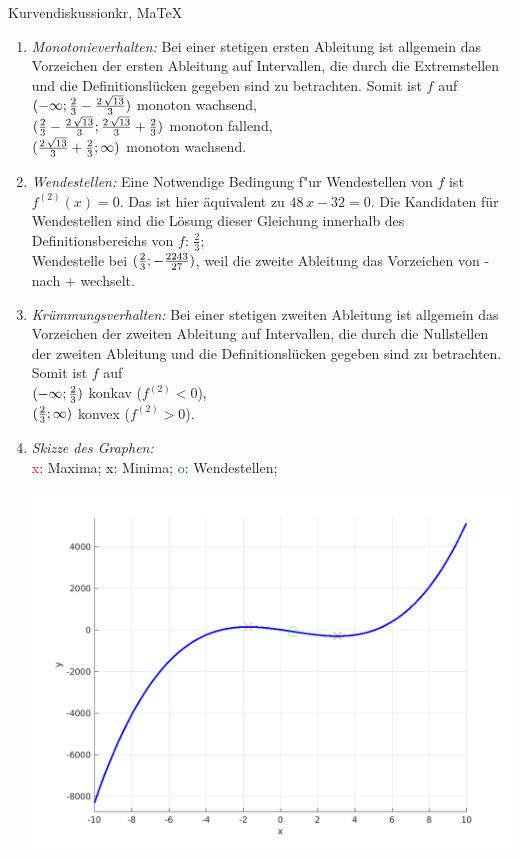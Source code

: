 \begin{MAufgabe}{Kurvendiskussion}{kr, MaTeX}
\begin{enumerate}
 \item \emph{Monotonieverhalten:} 
 Bei einer stetigen ersten Ableitung ist allgemein das Vorzeichen der ersten Ableitung auf Intervallen, die durch die Extremstellen und die Definitionsl\"ucken gegeben sind zu betrachten. Somit ist $f$ auf \\ 
 $(-\infty;\frac{2}{3} - \frac{2\, \sqrt{13}}{3})$ monoton wachsend, \\ 
 $(\frac{2}{3} - \frac{2\, \sqrt{13}}{3};\frac{2\, \sqrt{13}}{3} + \frac{2}{3})$ monoton  fallend, \\ 
 $(\frac{2\, \sqrt{13}}{3} + \frac{2}{3}; \infty)$ monoton wachsend. \\ 
 \item \emph{Wendestellen:} 
 Eine Notwendige Bedingung f"ur Wendestellen von $f$ ist $f^{(2)}(x)=0$. 
 Das ist hier \"aquivalent zu $48\, x - 32=0$. 
 Die Kandidaten f\"ur Wendestellen sind die L\"osung dieser Gleichung innerhalb des Definitionsbereichs von $f$: $\frac{2}{3}$; \\ 
 Wendestelle bei $(\frac{2}{3};- \frac{2243}{27})$, weil die zweite Ableitung das Vorzeichen von - nach + wechselt. \\ 
 \item \emph{Kr\"ummungsverhalten:} 
 Bei einer stetigen zweiten Ableitung ist allgemein das Vorzeichen der zweiten Ableitung auf Intervallen, die durch die Nullstellen der zweiten Ableitung und die Definitionsl\"ucken gegeben sind zu betrachten. 
 Somit ist $f$ auf \\ 
 $(-\infty ;\frac{2}{3})$  konkav ($f^{(2)}<0$), \\ 
 $(\frac{2}{3}; \infty)$  konvex ($f^{(2)}>0$). \\ 
 \item \emph{Skizze des Graphen:} \\ 
 {\textcolor{red} x}: Maxima; {\textcolor{black} x}: Minima; {\textcolor{green} o}: Wendestellen; 
  \begin{center}
  \includegraphics[width=0.8\linewidth]{Abb_zur_Ag_autogenerated_fractions_42.png} \end{center}
  
 \end{enumerate}
 \else\relax\fi
  \end{MAufgabe}